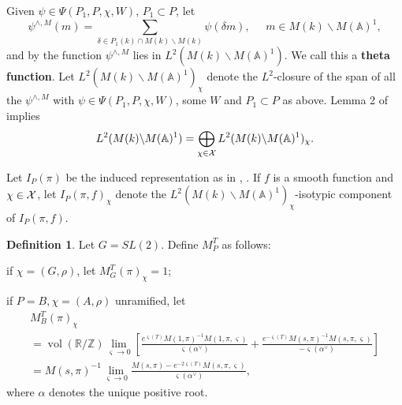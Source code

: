 \documentclass[12pt,letterpaper,openany]{book}
\theoremstyle{plain}
\theoremstyle{definition}
\newtheorem{definition}[theorem]{Definition}
\theoremstyle{remark}
\theoremstyle{remark}
\begin{document}
Given $\psi \in \Psi (P_1,P,\chi,W )$, $P_1\subset P$, let
\[
\psi ^{\wedge ,M}(m)=
\sum_{\delta \in P_1(k)\cap M(k)\backslash
M(k)}\psi (\delta m),\;\;\;\;\;m\in M(k)\backslash
M({\mathbb{A}})^1,
\]
and by \cite[Lemma 1]{L1} the function $\psi ^{\wedge ,M}$ lies in
$L^2(M(k)\backslash M({\mathbb{A}})^1)$. We call this a {\bf theta function}.
Let $L^2(M(k)\backslash M({\mathbb{A}})^1)_\chi $ denote
the $L^2$-closure of the span of all the $\psi ^{\wedge ,M}$ with $\psi \in
\Psi (P_1,P,\chi,W )$, some $W$ and $P_1\subset P$ as above.
Lemma 2 of \cite{L1} implies
\begin{equation}
L^2(M(k)\backslash M({\mathbb{A}})^1)=\bigoplus_{\chi \in
{\cal X}}L^2(M(k)\backslash M({\mathbb{A}})^1)_\chi .
\end{equation}

Let $I_P(\pi)$ be the induced representation as in \cite{A2},
\cite{A3}. If $f$ is a smooth function and $\chi\in {\cal X}$,
let $I_P(\pi,f)_\chi$ denote the
$L^2(M(k)\backslash M({\mathbb{A}})^1)_\chi$-isotypic component
of $I_P(\pi,f)$.

\begin{definition}
Let $G=SL(2)$. Define $M^T_P$ as follows:

if $\chi =(G,\rho )$, let $M_G^T(\pi )_\chi =1$;

if $P=B,\chi =(A,\rho )$ unramified, let
\[
\begin{array}{c}
M_B^T(\pi )_\chi \\
=\operatorname{vol}({\mathbb{R}}/{\mathbb{Z}})
\lim_{\varsigma \rightarrow 0}
\left[
\frac{e^{\varsigma (T)}
M(1,\pi )^{-1}M(1,\pi ,\varsigma )}{\varsigma (\alpha^{\vee })}
+\frac{e^{-\varsigma (T)}
M(s,\pi )^{-1}M(s,\pi ,\varsigma )}{-\varsigma (\alpha^{\vee })}
\right]\\
=M(s,\pi)^{-1}
\lim_{\varsigma \rightarrow 0}
{\frac{M(s,\pi)-e^{-2\varsigma (T)}M(s,\pi,\varsigma)}{\varsigma(\alpha^\vee)}} ,
\end{array}
\]
where $\alpha $ denotes the unique positive root.
\end{definition}
\end{document}
